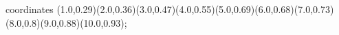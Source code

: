 					coordinates { (1.0,0.29)(2.0,0.36)(3.0,0.47)(4.0,0.55)(5.0,0.69)(6.0,0.68)(7.0,0.73)(8.0,0.8)(9.0,0.88)(10.0,0.93)};